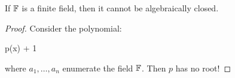 \begin{proposition}
  If $\mathbb{F}$ is a finite field, then it cannot be algebraically closed.
\end{proposition}

\begin{proof}
  Consider the polynomial:

  \begin{nedqn}
    p(x)
  \eqcol
    \cdots
    + 1
  \end{nedqn}

  \noindent
  where $a_1, \ldots, a_n$ enumerate the field $\mathbb{F}$. Then $p$ has no
  root!
\end{proof}

